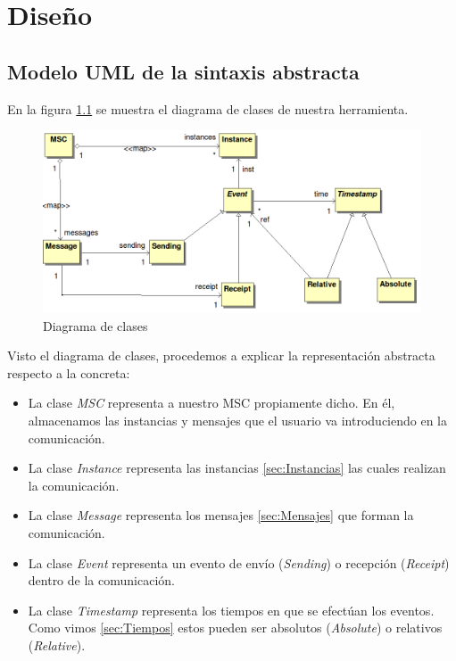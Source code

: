 \chapter{Diseño}
\label{ch:diseno}

\section{Modelo UML de la sintaxis abstracta}

En la figura \ref{fig:modelo-ast} se muestra el diagrama de clases de
nuestra herramienta.

\begin{figure}
  \includegraphics[width=1.0\linewidth]{./images/modelo-ast}
  \caption{Diagrama de clases}
  \label{fig:modelo-ast}
\end{figure}

Visto el diagrama de clases, procedemos a explicar la representación
abstracta respecto a la concreta:
\begin{itemize}
\item La clase \textit{MSC} representa a nuestro MSC propiamente
  dicho. En él, almacenamos las instancias y mensajes que el usuario va
  introduciendo en la comunicación.
\item La clase \textit{Instance} representa las instancias
  \ref{sec:Instancias}  las cuales realizan la comunicación.
\item La clase \textit{Message} representa los mensajes
  \ref{sec:Mensajes} que forman la comunicación.
\item La clase \textit{Event} representa un evento de envío
  (\textit{Sending}) o recepción (\textit{Receipt}) dentro de la
  comunicación.
\item La clase \textit{Timestamp} representa los tiempos en que se
  efectúan los eventos. Como vimos \ref{sec:Tiempos} estos pueden ser
  absolutos (\textit{Absolute}) o relativos (\textit{Relative}).
\end{itemize}

